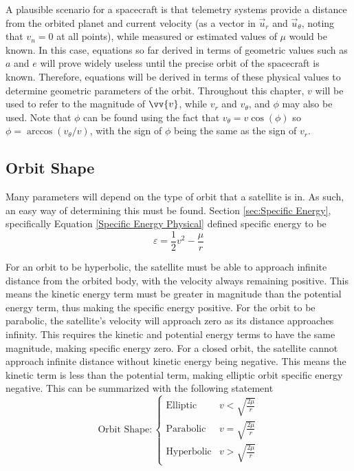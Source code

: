 \documentclass{article}
\begin{document}
A plausible scenario for a spacecraft is that telemetry systems provide a distance from the orbited planet and current velocity (as a vector in $\vec{u}_r$ and $\vec{u}_\theta$, noting that $v_n=0$ at all points), while measured or estimated values of $\mu$ would be known. In this case, equations so far derived in terms of geometric values such as $a$ and $e$ will prove widely useless until the precise orbit of the spacecraft is known. Therefore, equations will be derived in terms of these physical values to determine geometric parameters of the orbit. Throughout this chapter, $v$ will be used to refer to the magnitude of $\vv{v}$, while $v_r$ and $v_\theta$, and $\phi$ may also be used. Note that $\phi$ can be found using the fact that $v_\theta=v\cos(\phi)$ so $\phi=\arccos(v_\theta/v)$, with the sign of $\phi$ being the same as the sign of $v_r$.

\bigskip\bigskip
\subsection{Orbit Shape}

Many parameters will depend on the type of orbit that a satellite is in. As such, an easy way of determining this must be found. Section \ref{sec:Specific Energy}, specifically Equation \eqref{Specific Energy Physical} defined specific energy to be
$$\varepsilon=\frac{1}{2}v^2-\frac{\mu}{r}$$

For an orbit to be hyperbolic, the satellite must be able to approach infinite distance from the orbited body, with the velocity always remaining positive. This means the kinetic energy term must be greater in magnitude than the potential energy term, thus making the specific energy positive. For the orbit to be parabolic, the satellite's velocity will approach zero as its distance approaches infinity. This requires the kinetic and potential energy terms to have the same magnitude, making specific energy zero. For a closed orbit, the satellite cannot approach infinite distance without kinetic energy being negative. This means the kinetic term is less than the potential term, making elliptic orbit specific energy negative. This can be summarized with the following statement
\begin{equation}\label{Orbit Shape Physical}
    \text{Orbit Shape}: \begin{cases}
        \text{Elliptic}   & v<\sqrt{\frac{2\mu}{r}} \\
        \text{Parabolic}  & v=\sqrt{\frac{2\mu}{r}} \\
        \text{Hyperbolic} & v>\sqrt{\frac{2\mu}{r}}
    \end{cases}
\end{equation}
\end{document}
